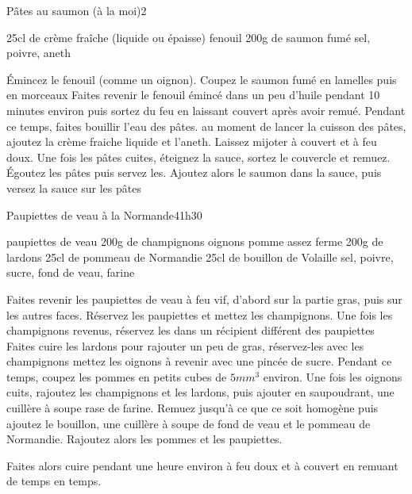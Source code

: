 \begin{recette}{Pâtes au saumon (à la moi)}{2}{}{}
\begin{ingredients}
\ingredient 25cl de crème fraîche (liquide ou épaisse)
 fenouil
\ingredient 200g de saumon fumé
\ingredient sel, poivre, aneth
\end{ingredients}

\begin{preparation}
\etape Émincez le fenouil (comme un oignon). Coupez le saumon fumé en lamelles puis en morceaux
\etape Faites revenir le fenouil émincé dans un peu d'huile pendant 10 minutes environ puis sortez du feu en
laissant couvert après avoir remué.
\etape Pendant ce temps, faites bouillir l'eau des pâtes. 
\etape au moment de lancer la cuisson des pâtes, ajoutez la crème fraiche liquide et l'aneth. Laissez mijoter à couvert et à
feu doux.
\etape Une fois les pâtes cuites, éteignez la sauce, sortez le couvercle et remuez. 
\etape Égoutez les pâtes puis servez les. 
\etape Ajoutez alors le saumon dans la sauce, puis versez la sauce sur les pâtes
\end{preparation}

\end{recette}

\begin{recette}{Paupiettes de veau à la Normande}{4}{1h30}{}
\begin{ingredients}
 paupiettes de veau
\ingredient 200g de champignons
 oignons
 pomme assez ferme
\ingredient 200g de lardons
\ingredient 25cl de pommeau de Normandie
\ingredient 25cl de bouillon de Volaille
\ingredient sel, poivre, sucre, fond de veau, farine
\end{ingredients}

\begin{preparation}
\etape Faites revenir les paupiettes de veau à feu vif, d'abord sur la partie gras, puis sur les autres faces. 
\etape Réservez les paupiettes et mettez les champignons.
\etape Une fois les champignons revenus, réservez les dans un récipient différent des paupiettes
\etape Faites cuire les lardons pour rajouter un peu de gras, réservez-les avec les champignons
\etape mettez les oignons à revenir avec une pincée de sucre. 
\etape Pendant ce temps, coupez les pommes en petits cubes de $5\unit{mm^3}$ environ. 
\etape Une fois les oignons cuits, rajoutez les champignons et les lardons, puis ajouter en saupoudrant, une cuillère à soupe rase de farine. Remuez jusqu'à ce que ce soit homogène puis ajoutez le bouillon, une cuillère à soupe de fond de veau et le pommeau de Normandie. 
\etape Rajoutez alors les pommes et les paupiettes.
\end{preparation}

\begin{cuisson}
Faites alors cuire pendant une heure environ à feu doux et à couvert en remuant de temps en temps.
\end{cuisson}


\end{recette}

